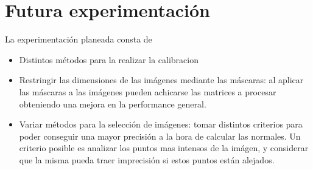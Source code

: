 \section{Futura experimentación}

La experimentación planeada consta de

\begin{itemize}
\item Distintos métodos para la realizar la calibracion
\item Restringir las dimensiones de las imágenes mediante las máscaras: al aplicar las máscaras a las imágenes pueden achicarse las matrices a procesar obteniendo una mejora en la performance general.
\item Variar métodos para la selección de imágenes: tomar distintos criterios para poder conseguir una mayor precisión a la hora de calcular las normales. Un criterio posible es analizar los puntos mas intensos de la imágen, y considerar que la misma pueda traer imprecisión si estos puntos están alejados.
\end{itemize}